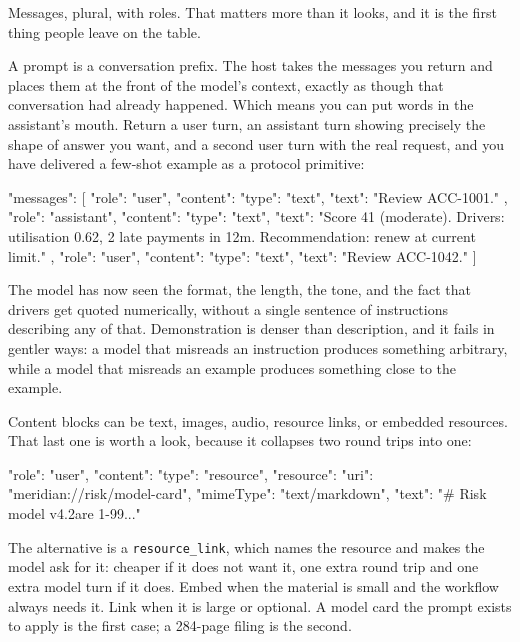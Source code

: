 Messages, plural, with roles. That matters more than it looks, and it is the
first thing people leave on the table.

A prompt is a conversation prefix. The host takes the messages you return and
places them at the front of the model's context, exactly as though that
conversation had already happened. Which means you can put words in the
assistant's mouth. Return a user turn, an assistant turn showing precisely the
shape of answer you want, and a second user turn with the real request, and you
have delivered a few-shot example as a protocol primitive:

\begin{wire}
"messages": [
  { "role": "user",
    "content": { "type": "text", "text": "Review ACC-1001." } },
  { "role": "assistant",
    "content": { "type": "text", "text":
      "Score 41 (moderate). Drivers: utilisation 0.62, 2 late payments in 12m.
       Recommendation: renew at current limit." } },
  { "role": "user",
    "content": { "type": "text", "text": "Review ACC-1042." } }
]
\end{wire}

The model has now seen the format, the length, the tone, and the fact that
drivers get quoted numerically, without a single sentence of instructions
describing any of that. Demonstration is denser than description, and it fails
in gentler ways: a model that misreads an instruction produces something
arbitrary, while a model that misreads an example produces something close to
the example.

Content blocks can be text, images, audio, resource links, or embedded
resources. That last one is worth a look, because it collapses two round trips
into one:

\begin{wire}
{ "role": "user",
  "content": {
    "type": "resource",
    "resource": {
      "uri": "meridian://risk/model-card",
      "mimeType": "text/markdown",
      "text": "# Risk model v4.2\n\nScores are 1-99..."
    } } }
\end{wire}

The alternative is a \texttt{resource\_link}, which names the resource and makes
the model ask for it: cheaper if it does not want it, one extra round trip and
one extra model turn if it does. Embed when the material is small and the
workflow always needs it. Link when it is large or optional. A model card the
prompt exists to apply is the first case; a 284-page filing is the second.


